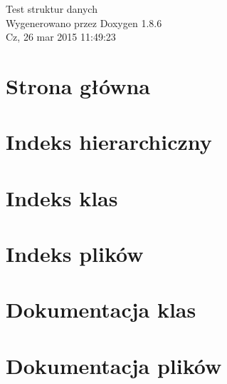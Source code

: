 \documentclass[twoside]{book}
\newcommand{\clearemptydoublepage}{%
  \newpage{\pagestyle{empty}\cleardoublepage}%
}
\begin{document}
\hypersetup{pageanchor=false}
\begin{titlepage}
\vspace*{7cm}
\begin{center}%
{\Large Test struktur danych }\\
\vspace*{1cm}
{\large Wygenerowano przez Doxygen 1.8.6}\\
\vspace*{0.5cm}
{\small Cz, 26 mar 2015 11:49:23}\\
\end{center}
\end{titlepage}
\clearemptydoublepage
\tableofcontents
\clearemptydoublepage
{}
\hypersetup{pageanchor=true}

\chapter{Strona główna}
\label{index}\hypertarget{index}{}
\chapter{Indeks hierarchiczny}

\chapter{Indeks klas}

\chapter{Indeks plików}

\chapter{Dokumentacja klas}









\chapter{Dokumentacja plików}











\newpage
{}
{}
\printindex
\end{document}
